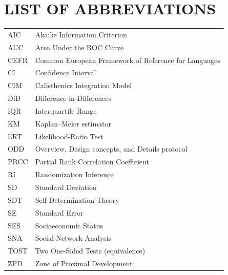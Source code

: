 \newpage\thispagestyle{empty}\mbox{}

\clearpage
\tableofcontents
\thispagestyle{fancy}

\newpage\thispagestyle{empty}\mbox{}

\clearpage
\listoffigures
\thispagestyle{fancy}

\newpage\thispagestyle{empty}\mbox{}

\clearpage
\listoftables
\thispagestyle{fancy}

\newpage\thispagestyle{empty}\mbox{}

\clearpage
\chapter*{\uppercase{List of Abbreviations}}
\thispagestyle{fancy}

\begin{tabular}{@{}p{2.2cm}l@{}}
AIC  & Akaike Information Criterion\\
AUC  & Area Under the ROC Curve\\
CEFR & Common European Framework of Reference for Languages\\
CI   & Confidence Interval\\
CIM  & Calisthenics Integration Model\\
DiD  & Difference-in-Differences\\
IQR  & Interquartile Range\\
KM   & Kaplan--Meier estimator\\
LRT  & Likelihood-Ratio Test\\
ODD  & Overview, Design concepts, and Details protocol\\
PRCC & Partial Rank Correlation Coefficient\\
RI   & Randomization Inference\\
SD   & Standard Deviation\\
SDT  & Self-Determination Theory\\
SE   & Standard Error\\
SES  & Socioeconomic Status\\
SNA  & Social Network Analysis\\
TOST & Two One-Sided Tests (equivalence)\\
ZPD  & Zone of Proximal Development\\
\end{tabular}

\newpage\thispagestyle{empty}\mbox{}

\clearpage
{}
